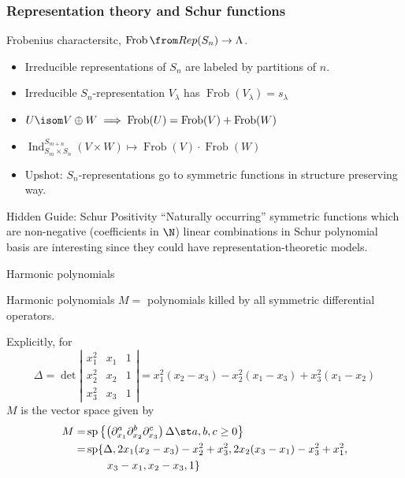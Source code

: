 \documentclass[dvipsnames,handout]{beamer}
\renewcommand{\Span}{\operatorname{sp}}
\DeclareMathOperator{\Ind}{Ind}
\theoremstyle{definition}
\newcounter{c}
\begin{document}
\begin{frame}
  \frametitle{Representation theory and Schur functions}
  Frobenius charactersitc, \(\operatorname{Frob}\from Rep(S_n) \to \Lambda\). \pause
    \begin{itemize}
    \item Irreducible representations of \(S_n\) are labeled by
      partitions of \(n\). \pause
    \item Irreducible \(S_n\)-representation \(V_\lambda\) has 
      \(\operatorname{Frob}(V_\lambda) = s_\lambda\) \pause
    \item \(U \isom V \oplus W \implies \operatorname{Frob}(U) = \operatorname{Frob}(V)+\operatorname{Frob}(W)\)\pause
    \item \(\Ind_{S_m \times S_n}^{S_{m+n}} (V \times W) \mapsto
      \operatorname{Frob}(V) \cdot \operatorname{Frob}(W)\) \pause
    \item Upshot: \(S_n\)-representations go to symmetric functions in
    structure preserving way. \pause
    \end{itemize}
  \begin{block}{Hidden Guide: Schur Positivity}
    ``Naturally occurring'' symmetric functions which are non-negative
    (coefficients in \(\N\))
    linear combinations in Schur polynomial basis
     are interesting since they could have representation-theoretic models.
  \end{block}
\end{frame}
\begin{frame}{Harmonic polynomials}
  \begin{block}{Harmonic polynomials}
   \(M =\) polynomials killed by all symmetric differential
   operators.
  \end{block}\pause
  Explicitly, for
   \[
     \Delta = \det \left|
       \begin{matrix}
         x_1^2 & x_1 & 1\\
         x_2^2 & x_2 & 1\\
         x_3^2 & x_3 & 1
       \end{matrix}
     \right| = x_1^2(x_2-x_3) - x_2^2 (x_1 - x_3) + x_3^2(x_1-x_2)
   \]\pause
   \(M\) is the vector space given by\pause
   \begin{align*}
       M  = & \Span\left\{
\left(           \partial_{x_1}^a
           \partial_{x_2}^b  \partial_{x_3}^c
\right)         \Delta \st a,b,c \geq 0\right\} \\
        = & \Span\{\Delta, 2x_1(x_2-x_3)-x_2^2+x_3^2,
            2x_2(x_3-x_1)-x_3^2+x_1^2, \\
       & \phantom{\Span\{\}}x_3-x_1, x_2-x_3,1\}
   \end{align*}
\end{frame}
\end{document}
